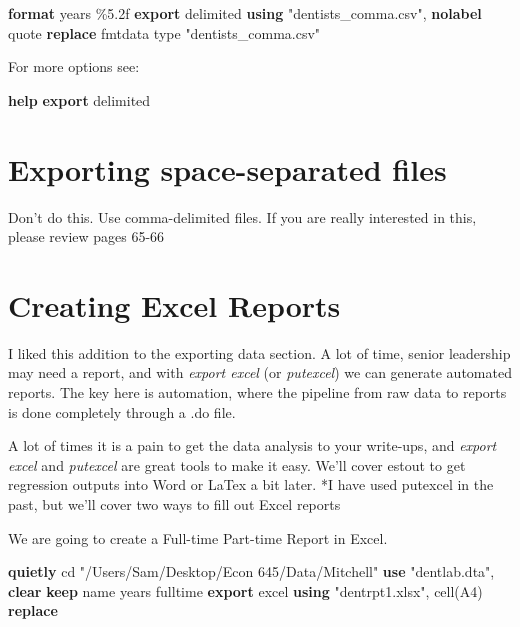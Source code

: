 \documentclass[
]{book}
\newenvironment{Shaded}{\begin{snugshade}}{\end{snugshade}}
\newcommand{\BaseNTok}[1]{\textcolor[rgb]{0.00,0.00,0.81}{#1}}
\newcommand{\DecValTok}[1]{\textcolor[rgb]{0.00,0.00,0.81}{#1}}
\newcommand{\KeywordTok}[1]{\textcolor[rgb]{0.13,0.29,0.53}{\textbf{#1}}}
\newcommand{\NormalTok}[1]{#1}
\newcommand{\StringTok}[1]{\textcolor[rgb]{0.31,0.60,0.02}{#1}}
\begin{document}
\begin{Shaded}
\begin{Highlighting}[]
\KeywordTok{format}\NormalTok{ years \%5.2f}
\KeywordTok{export}\NormalTok{ delimited }\KeywordTok{using} \StringTok{"dentists\_comma.csv"}\NormalTok{, }\KeywordTok{nolabel}\NormalTok{ quote }\KeywordTok{replace}\NormalTok{ fmtdata}
\DecValTok{type} \StringTok{"dentists\_comma.csv"}
\end{Highlighting}
\end{Shaded}

For more options see:

\begin{Shaded}
\begin{Highlighting}[]
\KeywordTok{help} \KeywordTok{export}\NormalTok{ delimited}
\end{Highlighting}
\end{Shaded}

\section{Exporting space-separated files}\label{exporting-space-separated-files}

Don't do this. Use comma-delimited files. If you are really interested in this, please review pages 65-66

\section{Creating Excel Reports}\label{creating-excel-reports}

I liked this addition to the exporting data section. A lot of time, senior leadership may need a report, and with \emph{export excel} (or \emph{putexcel}) we can generate automated reports. The key here is automation, where the pipeline from raw data to reports is done completely through a .do file.

A lot of times it is a pain to get the data analysis to your write-ups, and \emph{export excel} and \emph{putexcel} are great tools to make it easy. We'll cover estout
to get regression outputs into Word or LaTex a bit later. *I have used
putexcel in the past, but we'll cover two ways to fill out Excel reports

We are going to create a Full-time Part-time Report in Excel.

\begin{Shaded}
\begin{Highlighting}[]
\KeywordTok{quietly}\NormalTok{ cd }\StringTok{"/Users/Sam/Desktop/Econ 645/Data/Mitchell"}
\KeywordTok{use} \StringTok{"dentlab.dta"}\NormalTok{, }\KeywordTok{clear}
\KeywordTok{keep} \BaseNTok{name}\NormalTok{ years fulltime}
\KeywordTok{export}\NormalTok{ excel }\KeywordTok{using} \StringTok{"dentrpt1.xlsx"}\NormalTok{, cell(A4) }\KeywordTok{replace}
\end{Highlighting}
\end{Shaded}
\end{document}

